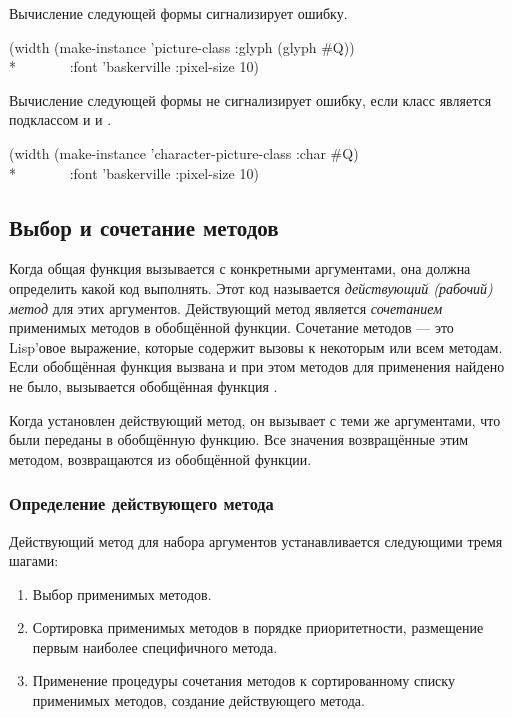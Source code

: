 Вычисление следующей формы сигнализирует ошибку.

\begin{lisp}
(width (make-instance 'picture-class :glyph (glyph \#{\Xbackslash}Q)) \\*
~~~~~~~:font 'baskerville :pixel-size 10)
\end{lisp}

Вычисление следующей формы не сигнализирует ошибку, если класс
 является подклассом и  и .

\begin{lisp}
(width (make-instance 'character-picture-class :char \#{\Xbackslash}Q) \\*
~~~~~~~:font 'baskerville :pixel-size 10)
\end{lisp}

\subsection{Выбор и сочетание методов}
\label{Method-Selection-and-Combination-SECTION}

Когда общая функция вызывается с конкретными аргументами, она должна
определить какой код выполнять. Этот код называется \emph{действующий (рабочий)
  метод} для этих аргументов. Действующий метод является \emph{сочетанием}
применимых методов в обобщённой функции.
Сочетание методов --- это Lisp'овое выражение, которые содержит вызовы к
некоторым или всем методам. Если обобщённая функция вызвана и при этом методов
для применения найдено не было, вызывается обобщённая функция .

Когда установлен действующий метод, он вызывает с теми же аргументами, что были
переданы в обобщённую функцию. Все значения возвращённые этим методом,
возвращаются из обобщённой функции.

\subsubsection{Определение действующего метода}
\label{Determining-the-Effective-Method-SECTION}

Действующий метод для набора аргументов устанавливается следующими тремя шагами:

\begin{enumerate}

\item Выбор применимых методов.

\item Сортировка применимых методов в порядке приоритетности, размещение первым наиболее
  специфичного метода.

\item Применение процедуры сочетания методов к сортированному списку применимых
  методов, создание действующего метода.

\end{enumerate}

